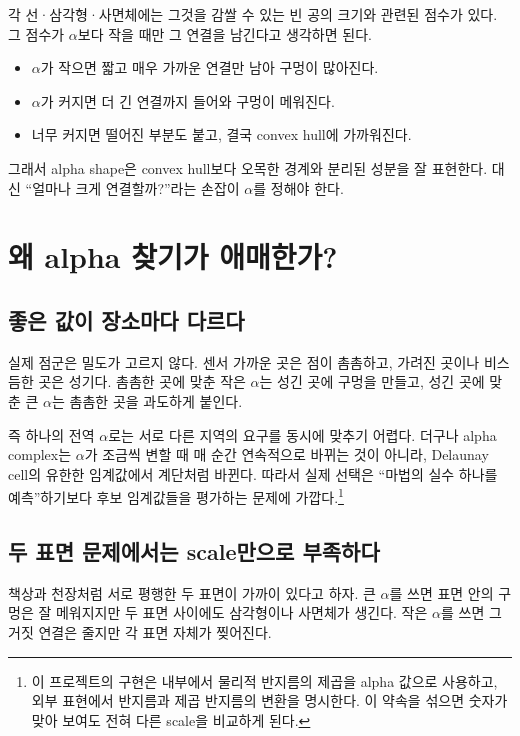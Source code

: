 \documentclass[11pt,a4paper]{article}
\begin{document}
각 선·삼각형·사면체에는 그것을 감쌀 수 있는 빈 공의 크기와 관련된 점수가 있다.
그 점수가 $\alpha$보다 작을 때만 그 연결을 남긴다고 생각하면 된다.

\begin{itemize}
  \item $\alpha$가 작으면 짧고 매우 가까운 연결만 남아 구멍이 많아진다.
  \item $\alpha$가 커지면 더 긴 연결까지 들어와 구멍이 메워진다.
  \item 너무 커지면 떨어진 부분도 붙고, 결국 convex hull에 가까워진다.
\end{itemize}

그래서 alpha shape은 convex hull보다 오목한 경계와 분리된 성분을 잘 표현한다.
대신 ``얼마나 크게 연결할까?''라는 손잡이 $\alpha$를 정해야 한다.

\section{왜 alpha 찾기가 애매한가?}

\subsection{좋은 값이 장소마다 다르다}

실제 점군은 밀도가 고르지 않다. 센서 가까운 곳은 점이 촘촘하고, 가려진 곳이나
비스듬한 곳은 성기다. 촘촘한 곳에 맞춘 작은 $\alpha$는 성긴 곳에 구멍을 만들고,
성긴 곳에 맞춘 큰 $\alpha$는 촘촘한 곳을 과도하게 붙인다.

즉 하나의 전역 $\alpha$로는 서로 다른 지역의 요구를 동시에 맞추기 어렵다.
더구나 alpha complex는 $\alpha$가 조금씩 변할 때 매 순간 연속적으로 바뀌는 것이
아니라, Delaunay cell의 유한한 임계값에서 계단처럼 바뀐다.
따라서 실제 선택은 ``마법의 실수 하나를 예측''하기보다 후보 임계값들을 평가하는
문제에 가깝다.\footnote{이 프로젝트의 구현은 내부에서 물리적 반지름의 제곱을
alpha 값으로 사용하고, 외부 표현에서 반지름과 제곱 반지름의 변환을 명시한다.
이 약속을 섞으면 숫자가 맞아 보여도 전혀 다른 scale을 비교하게 된다.}

\subsection{두 표면 문제에서는 scale만으로 부족하다}

책상과 천장처럼 서로 평행한 두 표면이 가까이 있다고 하자. 큰 $\alpha$를 쓰면
표면 안의 구멍은 잘 메워지지만 두 표면 사이에도 삼각형이나 사면체가 생긴다.
작은 $\alpha$를 쓰면 그 거짓 연결은 줄지만 각 표면 자체가 찢어진다.
\end{document}
